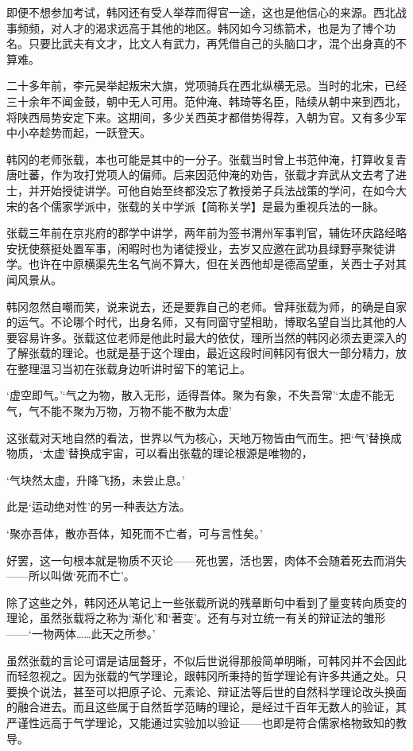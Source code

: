 即便不想参加考试，韩冈还有受人举荐而得官一途，这也是他信心的来源。西北战事频频，对人才的渴求远高于其他的地区。韩冈如今习练箭术，也是为了博个功名。只要比武夫有文才，比文人有武力，再凭借自己的头脑口才，混个出身真的不算难。

二十多年前，李元昊举起叛宋大旗，党项骑兵在西北纵横无忌。当时的北宋，已经三十余年不闻金鼓，朝中无人可用。范仲淹、韩琦等名臣，陆续从朝中来到西北，将陕西局势安定下来。这期间，多少关西英才都借势得荐，入朝为官。又有多少军中小卒趁势而起，一跃登天。

韩冈的老师张载，本也可能是其中的一分子。张载当时曾上书范仲淹，打算收复青唐吐蕃，作为攻打党项人的偏师。后来因范仲淹的劝告，张载才弃武从文去考了进士，并开始授徒讲学。可他自始至终都没忘了教授弟子兵法战策的学问，在如今大宋的各个儒家学派中，张载的关中学派【简称关学】是最为重视兵法的一脉。

张载三年前在京兆府的郡学中讲学，两年前为签书渭州军事判官，辅佐环庆路经略安抚使蔡挺处置军事，闲暇时也为诸徒授业，去岁又应邀在武功县绿野亭聚徒讲学。也许在中原横渠先生名气尚不算大，但在关西他却是德高望重，关西士子对其闻风景从。

韩冈忽然自嘲而笑，说来说去，还是要靠自己的老师。曾拜张载为师，的确是自家的运气。不论哪个时代，出身名师，又有同窗守望相助，博取名望自当比其他的人要容易许多。张载这位老师是他此时最大的依仗，理所当然的韩冈必须去更深入的了解张载的理论。也就是基于这个理由，最近这段时间韩冈有很大一部分精力，放在整理温习当初在张载身边听讲时留下的笔记上。

‘虚空即气。’‘气之为物，散入无形，适得吾体。聚为有象，不失吾常’‘太虚不能无气，气不能不聚为万物，万物不能不散为太虚’

这张载对天地自然的看法，世界以气为核心，天地万物皆由气而生。把‘气’替换成物质，‘太虚’替换成宇宙，可以看出张载的理论根源是唯物的，

‘气块然太虚，升降飞扬，未尝止息。’

此是‘运动绝对性’的另一种表达方法。

‘聚亦吾体，散亦吾体，知死而不亡者，可与言性矣。’

好罢，这一句根本就是物质不灭论——死也罢，活也罢，肉体不会随着死去而消失——所以叫做‘死而不亡’。

除了这些之外，韩冈还从笔记上一些张载所说的残章断句中看到了量变转向质变的理论，虽然张载将之称为‘渐化’和‘著变’。还有与对立统一有关的辩证法的雏形——‘一物两体……此天之所参。’

虽然张载的言论可谓是诘屈聱牙，不似后世说得那般简单明晰，可韩冈并不会因此而轻忽视之。因为张载的气学理论，跟韩冈所秉持的哲学理论有许多共通之处。只要换个说法，甚至可以把原子论、元素论、辩证法等后世的自然科学理论改头换面的融合进去。而且这些属于自然哲学范畴的理论，是经过千百年无数人的验证，其严谨性远高于气学理论，又能通过实验加以验证——也即是符合儒家格物致知的教导。

